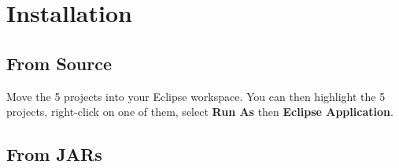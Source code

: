 \pagebreak
\section{Installation}
\subsection{From Source}
Move the 5 projects into your Eclipse workspace. You can then highlight the 5 projects, right-click on
one of them, select \textbf{Run As} then \textbf{Eclipse Application}. 
\subsection{From JARs}

